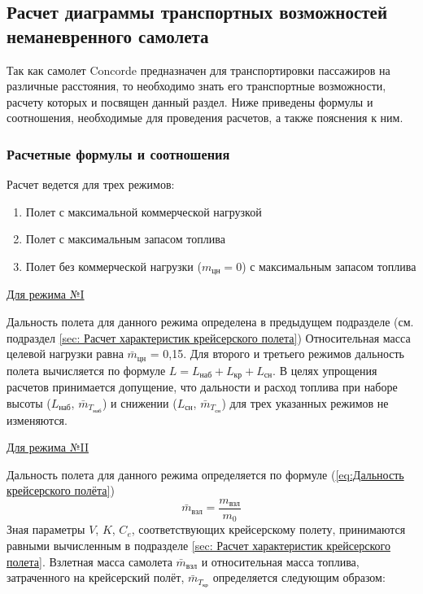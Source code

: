 \subsection{Расчет диаграммы транспортных возможностей неманевренного
самолета}
\label{sec:Расчет диаграммы транспортных возможностей неманевренного
самолета}
\pagestyle{fancy}
\fancyhf{}
\rfoot{\thepage}



\pagestyle{fancy}
\fancyhf{}
\rfoot{\thepage}

Так как самолет Concorde предназначен для транспортировки пассажиров на различные расстояния, то необходимо знать его транспортные возможности, расчету которых и посвящен данный раздел. Ниже приведены формулы и соотношения, необходимые для проведения расчетов, а также пояснения к ним. 

\subsubsection{Расчетные формулы и соотношения}

Расчет ведется для трех режимов: 

\begin{enumerate}
    \item Полет с максимальной коммерческой нагрузкой
    \item Полет с максимальным запасом топлива
    \item Полет без коммерческой нагрузки ($m_\text{цн} = 0$) с максимальным запасом топлива
\end{enumerate}

\underline{Для режима №I} 

Дальность полета для данного режима определена в предыдущем подразделе (см. подраздел \ref{sec: Расчет характеристик крейсерского полета}) Относительная масса целевой нагрузки равна $\bar{m}_\text{цн}$ = 0,15. Для второго и третьего режимов дальность полета вычисляется по формуле $L = L_\text{наб} + L_\text{кр} + L_\text{сн}$. В целях упрощения расчетов принимается допущение, что дальности и расход топлива при наборе высоты ($L_\text{наб}$, $\bar{m}_{T_\text{наб}}$) и снижении ($L_\text{сн}$, $\bar{m}_{T_\text{сн}}$) для трех указанных режимов не изменяются. 

\underline{Для режима №II} 

Дальность полета для данного режима определяется по формуле
(\ref{eq:Дальность крейсерского полёта})
$$\bar{m}_\text{взл} = \frac{m_\text{взл}}{m_0}$$
Зная параметры $V$, $K$, $C_e$, соответствующих крейсерскому
полету, принимаются равными вычисленным в подразделе \ref{sec: Расчет характеристик крейсерского полета}. Взлетная масса самолета $\bar{m}_\text{взл}$ и относительная масса топлива, затраченного на крейсерский полёт, $\bar{m}_{T_\text{кр}}$ определяется следующим образом:

